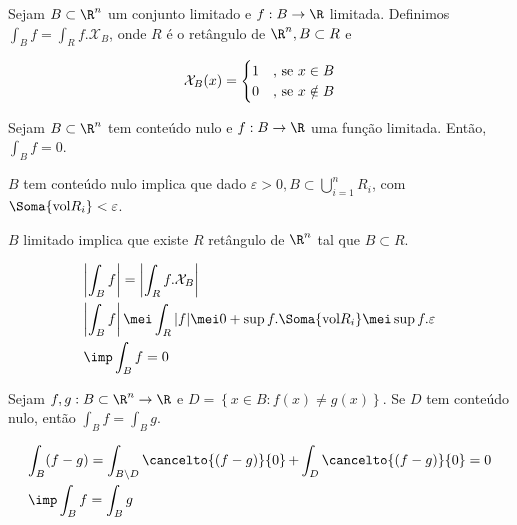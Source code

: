 \documentclass[11pt, oneside, a4paper]{gsm-l}
\begin{document}
\begin{defi}
Sejam $B \subset \R^n$ um conjunto limitado e $f:B \to \R$ limitada. Definimos $\int_B f = \int_R f.\mathcal{X}_B$, onde $R$ é o ret\^angulo de $\R^n, B \subset R$ e

\begin{equation*}
  \mathcal{X}_B (x) =
  \begin{cases}
    \hfill 1 	& \mbox{, se } x \in B \\
    \hfill 0 	& \mbox{, se } x \notin B
  \end{cases}
\end{equation*}
\end{defi}

\begin{prop}
Sejam $B \subset \R^n$ tem conte\'udo nulo e $f:B \to \R$ uma função limitada. Então, $\int_B f = 0$.
\end{prop}

\begin{dem}
$B$ tem conte\'udo nulo implica que dado $\varepsilon > 0, B \subset \bigcup\limits_{i = 1}^n {R_i }$, com $\Soma{\text{vol}R_i} < \varepsilon$.

$B$ limitado implica que existe $R$ ret\^angulo de $\R^n$ tal que $B \subset R$.

\[
\begin{gathered}
  \left| {\int_B f} \right| = \left| {\int_R f.\mathcal{X}_B} \right| \hfill \\
  \left| {\int_B f} \right| \mei \int_R |f| \mei 0 + \sup f. \Soma{\text{vol}R_i} \mei \sup f. \varepsilon \hfill \\
  \imp \int_B f = 0 \hfill
\end{gathered} 
\]

\end{dem}

\begin{cor}
Sejam $f,g: B \subset \R^n \to \R$ e $D = \left\{ {x \in B:f(x) \ne g(x)} \right\}$. Se $D$ tem conte\'udo nulo, então $\int_B f = \int_B g$.
\end{cor}

\begin{dem}

\[
\begin{gathered}
  \int_B (f-g) = \int_{B \setminus D} \mathop {\cancelto{\left( f-g \right)}{0}} + \int_D \mathop {\cancelto{\left( f-g \right)}{0}} = 0 \hfill \\
  \imp \int_B f = \int_B g \hfill \\ 
\end{gathered} 
\]

\end{dem}
\end{document}
